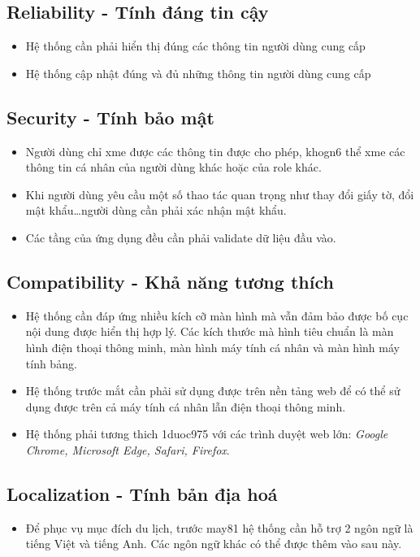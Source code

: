 \documentclass[../main.tex]{subfiles}
\begin{document}
	\subsection{Reliability - Tính đáng tin cậy}
	\begin{itemize}
		\item Hệ thống cần phải hiển thị đúng các thông tin người dùng cung cấp
		\item Hệ thống cập nhật đúng và đủ những thông tin người dùng cung cấp
	\end{itemize}

	\subsection{Security - Tính bảo mật}
	\begin{itemize}
		\item Người dùng chỉ xme được các thông tin được cho phép, khogn6 thể xme các thông tin cá nhân của người dùng
		khác hoặc của role khác.
		\item Khi người dùng yêu cầu một số thao tác quan trọng như thay đổi giấy tờ, đổi mật khẩu\ldots người dùng cần
		phải xác nhận mật khẩu.
		\item Các tầng của ứng dụng đều cần phải validate dữ liệu đầu vào.
	\end{itemize}

	\subsection{Compatibility - Khả năng tương thích}
	\begin{itemize}
		\item Hệ thống cần đáp ứng nhiều kích cỡ màn hình mà vẫn đảm bảo được bố cục nội dung được hiển thị hợp lý. Các kích
		thước mà hình tiêu chuẩn là màn hình điện thoại thông minh, màn hình máy tính cá nhân và màn hình máy tính bảng.
		\item Hệ thống trước mắt cần phải sử dụng được trên nền tảng web để có thể sử dụng được trên cả máy tính cá nhân lẫn
		điện thoại thông minh.
		\item Hệ thống phải tương thich 1duoc975 với các trình duyệt web lớn: \emph{Google Chrome, Microsoft Edge, Safari,
			Firefox}.
	\end{itemize}

	\subsection{Localization - Tính bản địa hoá}
	\begin{itemize}
		\item Để phục vụ mục đích du lịch, trước may81 hệ thống cần hỗ trợ 2 ngôn ngữ là tiếng Việt và tiếng Anh. Các ngôn
		ngữ khác có thể được thêm vào sau này.
	\end{itemize}
\end{document}
